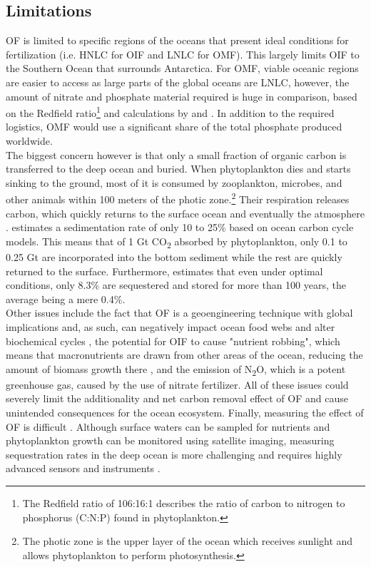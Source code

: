 \subsection*{Limitations}
OF is limited to specific regions of the oceans that present ideal conditions for fertilization (i.e. HNLC for OIF and LNLC for OMF). This largely limits OIF to the Southern Ocean that surrounds Antarctica. For OMF, viable oceanic regions are easier to access as large parts of the global oceans are LNLC, however, the amount of nitrate and phosphate material required is huge in comparison, based on the Redfield ratio\footnote{The Redfield ratio of 106:16:1 describes the ratio of carbon to nitrogen to phosphorus (C:N:P) found in phytoplankton.} and calculations by \textcite{S.F.Jones2014TheNourishment} and \textcite{Harrison2017GlobalFertilization}. In addition to the required logistics, OMF would use a significant share of the total phosphate produced worldwide.\\
The biggest concern however is that only a small fraction of organic carbon is transferred to the deep ocean and buried. When phytoplankton dies and starts sinking to the ground, most of it is consumed by zooplankton, microbes, and other animals within 100 meters of the photic zone.\footnote{The photic zone is the upper layer of the ocean which receives sunlight and allows phytoplankton to perform photosynthesis.} Their respiration releases carbon, which quickly returns to the surface ocean and eventually the atmosphere \parencite[82, 84]{NAS2022ASequestration}.
\textcite{Zeebe2005FeasibilityLevels} estimates a sedimentation rate of only 10 to 25\% based on ocean carbon cycle models. This means that of 1 Gt CO\textsubscript{2} absorbed by phytoplankton, only 0.1 to 0.25 Gt are incorporated into the bottom sediment while the rest are quickly returned to the surface. Furthermore, \textcite{Harrison2013AOcean} estimates that even under optimal conditions, only 8.3\% are sequestered and stored for more than 100 years, the average being a mere 0.4\%.\\
Other issues include the fact that OF is a geoengineering technique with global implications and, as such, can negatively impact ocean food webs and alter biochemical cycles \parencite{Chisholm2001Dis-CreditingFertilization, Zeebe2005FeasibilityLevels}, the potential for OIF to cause "nutrient robbing", which means that macronutrients are drawn from other areas of the ocean, reducing the amount of biomass growth there \parencite{Zeebe2005FeasibilityLevels}, and the emission of N\textsubscript{2}O, which is a potent greenhouse gas, caused by the use of nitrate fertilizer. All of these issues could severely limit the additionality and net carbon removal effect of OF and cause unintended consequences for the ocean ecosystem.
Finally, measuring the effect of OF is difficult \parencite[87]{NAS2022ASequestration}. Although surface waters can be sampled for nutrients and phytoplankton growth can be monitored using satellite imaging, measuring sequestration rates in the deep ocean is more challenging and requires highly advanced sensors and instruments \parencite{Chisholm2001Dis-CreditingFertilization, NAS2022ASequestration}.
